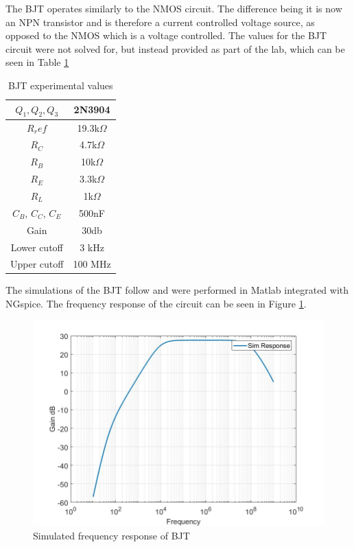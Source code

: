 
The BJT operates similarly to the NMOS circuit. The difference being it is now an NPN transistor and is therefore a current controlled voltage source, as opposed to the NMOS which is a voltage controlled. The values for the BJT circuit were not solved for, but instead provided as part of the lab, which can be seen in Table \ref{tab:bjttab}

\begin{table}[H]
	\centering
	\caption{BJT experimental values}
	\label{tab:bjttab}
	\begin{tabular}{|c|c|} \hline
		$Q_1, Q_2, Q_3$ & 2N3904        \\ \hline
		$R_ref$         & 19.3k$\Omega$ \\ \hline
		$R_C$           & 4.7k$\Omega$  \\ \hline
		$R_B$           & 10k$\Omega$   \\ \hline
		$R_E$           & 3.3k$\Omega$  \\ \hline
		$R_L$           & 1k$\Omega$    \\ \hline
		$C_B$, $C_C$, $C_E$ & 500nF      \\   \hline
		Gain            & 30db          \\  \hline
		Lower cutoff    & 3 kHz         \\  \hline
		Upper cutoff    & 100 MHz       \\  \hline  
	\end{tabular}
\end{table}

 The simulations of the BJT follow and were performed in Matlab integrated with NGspice. The frequency response of the circuit can be seen in Figure \ref{fig:bjtsimfreq}. 

\begin{figure}[H]
	\centering
	\includegraphics[width=.55\textwidth]{CircuitDevelopment/BJT_bandwidth.jpg}
	\caption{Simulated frequency response of BJT}
	\label{fig:bjtsimfreq}
\end{figure}

